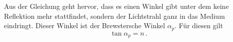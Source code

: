 Aus der Gleichung geht hervor, dass es einen Winkel gibt unter dem keine Reflektion mehr stattfindet, sondern der Lichtstrahl ganz in das Medium eindringt. 
Dieser Winkel ist der Brewstersche Winkel $\alpha_p$. Für diesen gilt
\begin{equation}
    \tan{\alpha_p} = n \, .
    \label{eqn:Brewster}
\end{equation}
